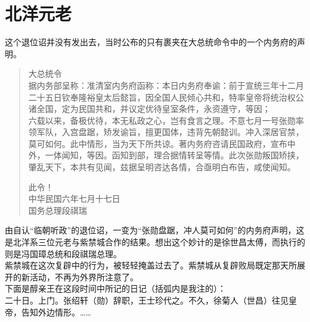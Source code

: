 \fancyhead[RO]{} %
\fancyhead[LE]{} %
\chapter*{北洋元老}
\thispagestyle{empty}
这个退位诏并没有发出去，当时公布的只有裹夹在大总统命令中的一个内务府的声明。\\

\begin{quote}
	大总统令\\

据内务部呈称：准清室内务府函称：本日内务府奉谕：前于宣统三年十二月二十五日钦奉隆裕皇太后懿旨，因全国人民倾心共和，特率皇帝将统治权公诸全国，定为民国共和，并议定优待皇室条件，永资遵守，等因；\\

六载以来，备极优待，本无私政之心，岂有食言之理。不意七月一号张勋率领军队，入宫盘踞，矫发谕旨，擅更国体，违背先朝懿训。冲入深居官禁，莫可如何。此中情形，当为天下所共谅。著内务府咨请民国政府，宣布中外，一体闻知，等因。函知到部，理合据情转呈等情。此次张勋叛国矫挟，肇乱天下，本共有见闻，兹据呈明咨达各情，合亟明白布告，咸使闻知。\\

\begin{flushright}
	此令！\\

中华民国六年七月十七日\\

国务总理段祺瑞
\end{flushright}
\end{quote}

由自认“临朝听政”的退位诏，一变为“张勋盘踞，冲人莫可如何”的内务府声明，这是北洋系三位元老与紫禁城合作的结果。想出这个妙计的是徐世昌太傅，而执行的则是冯国璋总统和段祺瑞总理。\\

紫禁城在这次复辟中的行为，被轻轻掩盖过去了。紫禁城从复辟败局既定那天所展开的新活动，不再为外界所注意了。\\

下面是醇亲王在这段时间中所记的日记（括弧内是我注的）：\\

二十日。上门。张绍轩（勋）辞职，王士珍代之。不久，徐菊人（世昌）往见皇帝，告知外边情形。……\\

